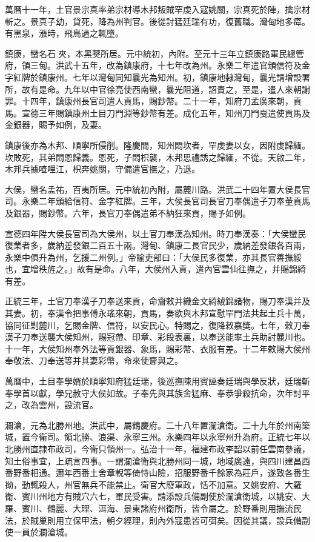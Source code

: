 \begin{pinyinscope}
萬曆十一年，土官景宗真率弟宗材導木邦叛賊罕虔入寇姚關，宗真死於陣，擒宗材斬之。景真子幼，貸死，降為州判官。後從討猛廷瑞有功，復舊職。灣甸地多瘴。有黑泉，漲時，飛鳥過之輒墮。

鎮康，蠻名石夾，本黑僰所居。元中統初，內附。至元十三年立鎮康路軍民總管府，領三甸。洪武十五年，改為鎮康府，十七年改為州。永樂二年遣官頒信符及金字紅牌於鎮康州。七年以灣甸同知曩光為知州。初，鎮康地隸灣甸，曩光請增設署所，故有是命。九年以中官徐亮使西南蠻，曩光阻道，詔責之，至是，遣人來朝謝罪。十四年，鎮康州長官司遣人貢馬，賜鈔幣。二十一年，知府刀孟廣來朝，貢馬。宣德三年賜鎮康州土目刀門淵等鈔幣有差。成化五年，知州刀門戛遣使貢馬及金銀器，賜予如例，及妻。

鎮康後亦為木邦、順寧所侵削。隆慶間，知州悶坎者，罕虔妻以女，因附虔歸緬。坎敗死，其弟悶恩歸義。恩死，子悶枳襲，木邦思禮誘之歸緬，不從。天啟二年，木邦兵據喳哩江，枳奔姚關，守備遣官撫之，乃退。

大侯，蠻名孟祐，百夷所居。元中統初內附，屬麓川路。洪武二十四年置大侯長官司。永樂二年頒給信符、金字紅牌。三年，大侯長官司長官刀奉偶遣子刀奉董貢馬及銀器，賜鈔幣。六年，長官刀奉偶遣弟不納狂來貢，賜予如例。

宣德四年陞大侯長官司為大侯州，以土官刀奉漢為知州。時刀奉漢奏：「大侯蠻民復業者多，歲納差發銀二百五十兩。灣甸、鎮康二長官民少，歲納差發銀各百兩，永樂中俱升為州，乞援二州例。」帝諭吏部曰：「大侯民多復業，亦其長官善撫綏也，宜增秩旌之。」故有是命。八年，大侯州入貢，遣內官雲仙往撫之，并賜錦綺有差。

正統三年，土官刀奉漢子刀奉送來貢，命齎敕并織金文綺絨錦諸物，賜刀奉漢并及其妻。初，奉漢令把事傅永瑤來朝，貢馬，奏欲與木邦宣慰罕門法共起土兵十萬，協同征剿麓川，乞賜金牌、信符，以安民心。特賜之，復降敕嘉獎。七年，敕刀奉漢子刀奉送襲大侯知州，賜冠帶、印章、彩段表裏，以奉送能率土兵助討麓川也。十一年，大侯知州奉外法等貢銀器、象馬，賜彩幣、衣服有差。十二年敕賜大侯州奉敬法、刀奉送等并其妻彩幣，命來使齎與之。

萬曆中，土目奉學婿於順寧知府猛廷瑞，後巡撫陳用賓誣奏廷瑞與學反狀，廷瑞斬奉學首以獻，學兄赦守大侯如故。子奉先與其族舍猛麻、奉恭爭殺抗命，次年討平之，改為雲州，設流官。

瀾滄，元為北勝州地。洪武中，屬鶴慶府。二十八年置瀾滄衛。二十九年於州南築城，置今衛司。領北勝、浪渠、永寧三州。永樂四年以永寧州升為府。正統七年以北勝州直隸布政司，今衛只領州一。弘治十一年，福建布政李韶以前任雲南參議，知土俗事宜，上疏言四事。一謂瀾滄衛與北勝州同一城，地域廣遠，與四川建昌西番野番相通。邇年西番土舍章輗等倚恃山險，招服野番千餘家為莊戶，遂致各番生拗，動輒殺人，州官無兵不能禁止。衛官大廢軍政，恬不加意。又姚安府、大羅衛、賓川州地方有賊穴六七，軍民受害。請添設兵備副使於瀾滄衛城，以姚安、大羅、賓川、鶴麗、大理、洱海、景東諸府州衛所，皆令屬之。於野番則用撫流民法，於賊巢則用立保甲法，朝夕經理，則內外寇患皆可弭矣。因從其議，設兵備副使一員於瀾滄城。


\end{pinyinscope}

